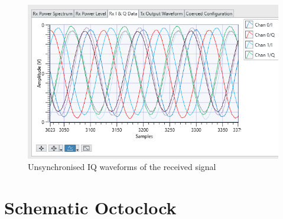 \begin{figure}[H]
    \centering
    \includegraphics[width=\linewidth]{images/SyncFailCapture.png}
    \caption{Unsynchronised IQ waveforms of the received signal}
    \label{fig:SyncFail2Ch}%
\end{figure}


\chapter{Schematic Octoclock}
\label{ch:HWSchOctoClock}






